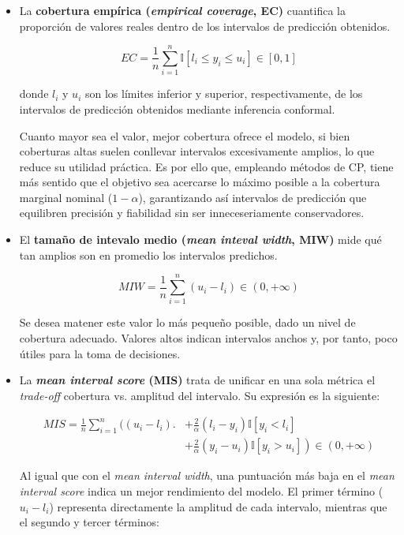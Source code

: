 \begin{itemize}
    \item La \textbf{cobertura empírica (\textit{empirical coverage}, EC)} cuantifica la proporción de valores
    reales dentro de los intervalos de predicción obtenidos. 
    
    $$
    EC = \frac{1}{n} 
        \sum_{i=1}^n{ \mathbb{I} \left[ l_i \le y_i \le u_i \right] } 
            \in \left[0, 1\right]
    $$

    donde $l_i$ y $u_i$ son los límites inferior y superior, respectivamente, de los intervalos de predicción 
    obtenidos mediante inferencia conformal.

    Cuanto mayor sea el valor, mejor cobertura ofrece el modelo, si bien coberturas altas suelen conllevar 
    intervalos excesivamente amplios, lo que reduce su utilidad práctica. Es por ello que, empleando métodos
    de CP, tiene más sentido que el objetivo sea acercarse lo máximo posible a la cobertura marginal 
    nominal ($1-\alpha$), garantizando así intervalos de predicción que equilibren precisión y fiabilidad sin
    ser inneceseriamente conservadores. 
    
    \item El \textbf{tamaño de intevalo medio (\textit{mean inteval width}, MIW)} mide qué tan amplios son en 
    promedio los intervalos predichos.
    
    $$
    MIW = \frac{1}{n} \sum_{i=1}^n{ \left( u_i - l_i \right) } \in (0, +\infty)
    $$
    
    Se desea matener este valor lo más pequeño posible, dado un nivel de cobertura adecuado. Valores altos
    indican intervalos anchos y, por tanto, poco útiles para la toma de decisiones. 


    \item La \textbf{\textit{mean interval score} (MIS)} \cite{gneiting2007} trata de unificar en una sola 
    métrica el \textit{trade-off} cobertura vs. amplitud del intervalo. Su expresión es la siguiente:

    \begin{align*} 
    MIS = \frac{1}{n} \sum_{i=1}^n
    \biggl( (u_i-l_i) \biggr.&+ \frac{2}{\alpha} \left( l_i-y_i \right) \mathbb{I}\left[ y_i<l_i \right] \\
    &+\left. \frac{2}{\alpha}  \left( y_i-u_i \right) \mathbb{I}\left[ y_i>u_i \right] \right)
    \in \left( 0, +\infty \right)
    \end{align*}

    Al igual que con el \textit{mean interval width}, una puntuación más baja en el \textit{mean interval 
    score} indica un mejor rendimiento del modelo. El primer término ($u_i-l_i$) representa directamente la 
    amplitud de cada intervalo, mientras que el segundo y tercer términos:


\end{itemize}
